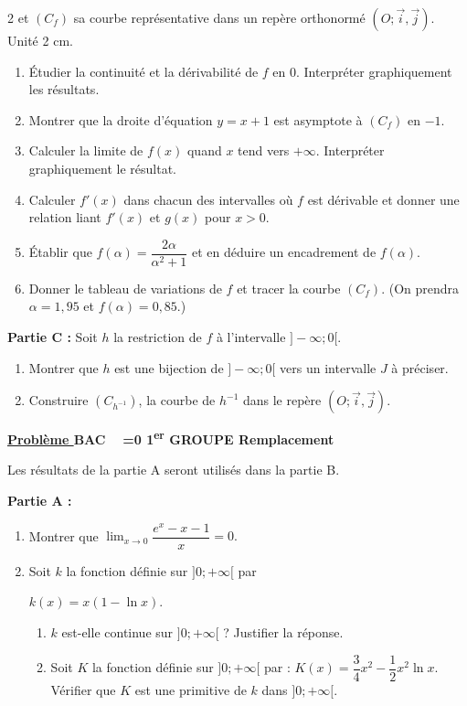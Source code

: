 \documentclass[12pt,a4paper]{article}
\newcounter{probleme}
\newcounter{annee}
\newcounter{session}
\newcommand{\exo}{%
    \refstepcounter{probleme}%
    \par\medskip
    \noindent\textbf{\underline{Problème \theprobleme}\quad
    BAC \theannee\ %
    \ifnum\value{session}=0
        1\textsuperscript{er} GROUPE%
        \setcounter{session}{1}%
    \else
        Remplacement%
        \setcounter{session}{0}%
        \stepcounter{annee}%
    \fi
    }
    \par\medskip
}
\begin{document}
\begin{multicols}{2}
et $(C_f)$ sa courbe représentative dans un repère orthonormé $(O;\vec{i},\vec{j})$. Unité 2 cm.

\begin{enumerate}
\item Étudier la continuité et la dérivabilité de $f$ en $0$. Interpréter graphiquement les résultats.

\item Montrer que la droite d’équation \( y=x+1 \) est asymptote à $(C_f)$ en $-1$.

\item Calculer la limite de $f(x)$ quand $x$ tend vers $+\infty$. Interpréter graphiquement le résultat.

\item Calculer \( f'(x) \) dans chacun des intervalles où $f$ est dérivable et donner une relation liant \( f'(x) \) et $g(x)$ pour $x>0$.

\item Établir que \( f(\alpha)=\dfrac{2\alpha}{\alpha^2+1} \) et en déduire un encadrement de $f(\alpha)$.
\item Donner le tableau de variations de $f$ et tracer la courbe $(C_f)$.  
(On prendra \( \alpha=1,95 \) et \( f(\alpha)=0,85 \).)
\end{enumerate}

\textbf{Partie C :} Soit $h$ la restriction de $f$ à l’intervalle $]-\infty;0[$.

\begin{enumerate}
\item Montrer que $h$ est une bijection de $]-\infty;0[$ vers un intervalle $J$ à préciser.

\item Construire $(C_{h^{-1}})$, la courbe de $h^{-1}$ dans le repère $(O;\vec{i},\vec{j})$.
\end{enumerate}
\exo

Les résultats de la partie A seront utilisés dans la partie B.

\textbf{Partie A :}

\begin{enumerate}
\item Montrer que \( \lim_{x\to 0} \dfrac{e^x-x-1}{x}=0. \)

\item Soit $k$ la fonction définie sur $]0;+\infty[$ par  

\( k(x)=x(1-\ln x). \)

\begin{enumerate}
\item $k$ est-elle continue sur $]0;+\infty[$ ? Justifier la réponse.
\item Soit $K$ la fonction définie sur $]0;+\infty[$ par :  
\( K(x)=\dfrac{3}{4}x^2-\dfrac{1}{2}x^2\ln x. \)  
Vérifier que $K$ est une primitive de $k$ dans $]0;+\infty[$.
\end{enumerate}
\end{enumerate}


\end{multicols}
\end{document}
